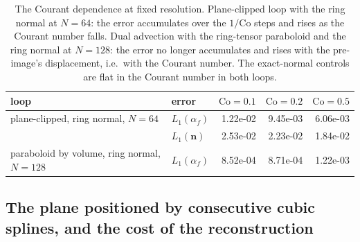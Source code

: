 \documentclass[preprint,12pt]{elsarticle}
\begin{document}
\begin{table}[htbp]
\centering
\caption{The Courant dependence at fixed resolution. Plane-clipped loop with the ring normal at $N = 64$: the error accumulates over the $1/\mathrm{Co}$ steps and rises as the Courant number falls. Dual advection with the ring-tensor paraboloid and the ring normal at $N = 128$: the error no longer accumulates and rises with the pre-image's displacement, i.e.\ with the Courant number. The exact-normal controls are flat in the Courant number in both loops.}
\label{tab:tpf-courant}
\footnotesize
\begin{tabular}{llrrr}
\toprule
loop & error & $\mathrm{Co} = 0.1$ & $\mathrm{Co} = 0.2$ & $\mathrm{Co} = 0.5$ \\
\midrule
plane-clipped, ring normal, $N = 64$ & $L_1(\alpha_f)$ & 1.22e-02 & 9.45e-03 & 6.06e-03 \\
 & $L_1(\mathbf{n})$ & 2.53e-02 & 2.23e-02 & 1.84e-02 \\
paraboloid by volume, ring normal, $N = 128$ & $L_1(\alpha_f)$ & 8.52e-04 & 8.71e-04 & 1.22e-03 \\
\bottomrule
\end{tabular}
\end{table}

\subsection{The plane positioned by consecutive cubic splines, and the cost of the reconstruction}
\label{sec:ccs}
\end{document}
